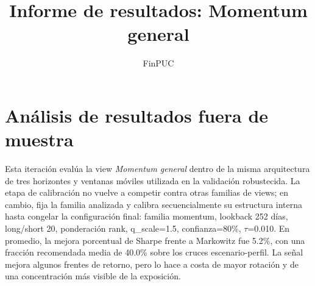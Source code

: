 \documentclass[11pt]{article}
\title{Informe de resultados: Momentum general}
\author{FinPUC}
\date{}
\begin{document}
\maketitle

\section{Análisis de resultados fuera de muestra}
Esta iteración evalúa la view \textit{Momentum general} dentro de la misma arquitectura de tres horizontes y ventanas móviles utilizada en la validación robustecida. La etapa de calibración no vuelve a competir contra otras familias de views; en cambio, fija la familia analizada y calibra secuencialmente su estructura interna hasta congelar la configuración final: familia momentum, lookback 252 días, long/short 20, ponderación rank, q\_scale=1.5, confianza=80\%, $\tau$=0.010.
En promedio, la mejora porcentual de Sharpe frente a Markowitz fue 5.2\%, con una fracción recomendada media de 40.0\% sobre los cruces escenario-perfil. La señal mejora algunos frentes de retorno, pero lo hace a costa de mayor rotación y de una concentración más visible de la exposición.
\begin{table}[H]
\centering
{}
\caption{Comparación fuera de muestra en horizonte limpio para Momentum general.}
\label{tab:momentum_general:resultados_oos}
\end{table}
\end{document}
